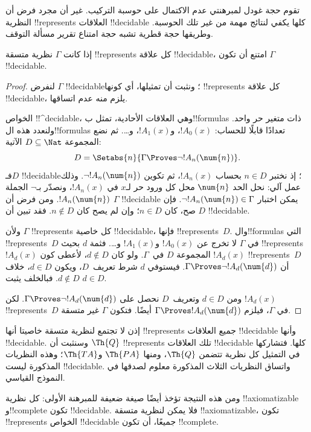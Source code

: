 \documentclass[../../../include/open-logic-section]{subfiles}
\begin{document}


تقوم حجة غودل لمبرهنتي عدم الاكتمال على حوسبة
التركيب. غير أن مجرد فرض أن النظرية !!{represents}
العلاقات !!{decidable} كلها يكفي لنتائج مهمة
من غير تلك الحوسبة. وطريقها حجة قطرية تشبه
حجة امتناع تقرير مسألة التوقف.

\begin{thm}
إذا كانت $\Gamma$ نظرية متسقة !!{represents}
كل علاقة !!{decidable}، امتنع أن تكون $\Gamma$
!!{decidable}.
\end{thm}

\begin{proof}
لنفرض $\Gamma$ !!{decidable}؛ ونثبت أن
تمثيلها، أي كونها !!{represents} كل علاقة
!!{decidable}، يلزم منه عدم اتساقها.

الخواص !!^{decidable}، وهي العلاقات الأحادية،
تمثل ب!!{formula}s ذات متغير حر واحد.
ولنعدد هذه ال!!{formula}s تعدادًا قابلًا
للحساب: $!A_0(x)$، و$!A_1(x)$، و\dots.
ثم نضع المجموعة $D\subseteq\Nat$ الآتية:
\[
D = \Setabs{n}{\Gamma \Proves \lnot !A_n(\num{n})}.
\]
فـ$D$ !!{decidable}؛ إذ نختبر $n\in D$
بحساب $!A_n(x)$، ثم تكوين $\lnot !A_n(\num{n})$.
وذلك عمل آلي: نحل الحد $\num{n}$ محل كل
ورود حر لـ$x$ في $!A_n(x)$، ونصدّر بـ$\lnot$
الجملة $!A_n(\num{n})$. ومن فرض أن $\Gamma$
!!{decidable} يمكن اختبار
$\lnot !A_n(\num{n})\in\Gamma$. فإن صح،
كان $n\in D$؛ وإن لم يصح كان $n\notin D$.
فقد تبين أن $D$ !!{decidable}.

ولأن $\Gamma$ !!{represents} كل خاصية
!!{decidable}، فإنها !!{represents}~$D$.
وال!!{formula}s التي !!{represents}~$D$
في $\Gamma$ لا تخرج عن $!A_0(x)$ و$!A_1(x)$
و\dots. فثمة $d$ بحيث !!{represents}
$!A_d(x)$ المجموعة $D$ في~$\Gamma$.
ولو كان $d\notin D$، لأعطى كون $!A_d(x)$
!!{represents}~$D$ أن
$\Gamma\Proves\lnot !A_d(\num{d})$.
فيستوفي $d$ شرط تعريف~$D$، ويكون $d\in D$،
خلاف $d\notin D$. فبالخلف يثبت $d\in D$.

ومن $d\in D$ وتعريف~$D$ نحصل على
$\Gamma\Proves\lnot !A_d(\num{d})$.
لكن $!A_d(x)$ !!{represents}~$D$ في $\Gamma$،
فيلزم $\Gamma\Proves !A_d(\num{d})$ أيضًا.
فتكون $\Gamma$ غير متسقة.
\end{proof}

\begin{explain}
إذن لا تجتمع لنظرية متسقة خاصيتا أنها
!!{represents} جميع العلاقات !!{decidable}
وأنها !!{decidable}. وسنثبت أن $\Th{Q}$
!!{represents} تلك العلاقات !!{decidable} كلها.
فتشاركها في التمثيل كل نظرية تتضمن $\Th{Q}$،
ومنها $\Th{PA}$ و$\Th{TA}$؛ وهذه النظريات
المذكورة ليست !!{decidable}. واتساق النظريات
الثلاث المذكورة معلوم لصدقها في النموذج القياسي.

ومن هذه النتيجة تؤخذ أيضًا صيغة ضعيفة للمبرهنة
الأولى: كل نظرية !!{axiomatizable} و!!{complete}
تكون !!{decidable}. فلا يمكن لنظرية متسقة
!!{axiomatizable}، تكون !!{represents}
الخواص !!{decidable} جميعًا، أن تكون
!!{complete}.
\end{explain}
\end{document}
